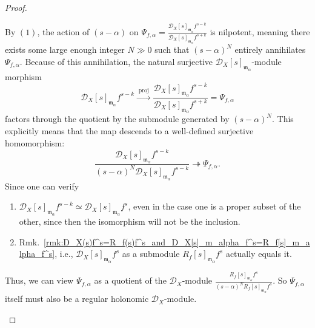 \begin{proof}
\begin{enumerate}
              By $(1)$, the action of $(s-\alpha)$ on $\Psi_{f,\alpha} = \frac{\mathcal{D}_{X}[s]_{\mathfrak{m}_{\alpha}}f^{s-k}}{\mathcal{D}_{X}[s]_{\mathfrak{m}_{\alpha}}f^{s+k}}$ is nilpotent, meaning there exists some large enough integer $N \gg 0$ such that $(s-\alpha)^N$ entirely annihilates $\Psi_{f,\alpha}$.
              Because of this annihilation, the natural surjective $\mathcal{D}_X[s]_{\mathfrak{m}_{\alpha}}$-module morphism
              \[
                  \mathcal{D}_{X}[s]_{\mathfrak{m}_{\alpha}}f^{s-k} \xrightarrow{\;\text{proj}\;} \frac{\mathcal{D}_{X}[s]_{\mathfrak{m}_{\alpha}}f^{s-k}}{\mathcal{D}_{X}[s]_{\mathfrak{m}_{\alpha}}f^{s+k}} = \Psi_{f,\alpha}
              \]
              factors through the quotient by the submodule generated by $(s-\alpha)^N$. This explicitly means that the map descends to a well-defined surjective homomorphism:
              \[
                  \frac{\mathcal{D}_X[s]_{\mathfrak{m}_{\alpha}} f^{s-k}}{(s-\alpha)^N \mathcal{D}_X[s]_{\mathfrak{m}_{\alpha}} f^{s-k}} \twoheadrightarrow \Psi_{f,\alpha}.
              \]
              Since one can verify
              \begin{enumerate}
                  \item $\mathcal{D}_{X}[s]_{\mathfrak{m}_{\alpha}}f^{s-k} \simeq \mathcal{D}_{X}[s]_{\mathfrak{m}_{\alpha}}f^{s}$, even in the case one is a proper subset of the other, since then the isomorphism will not be the inclusion.
                  \item Rmk.~\ref{rmk:D_X(s)f^s=R_f(s)f^s_and_D_X[s]_m_alpha_f^s=R_f[s]_m_alpha_f^s},
                        i.e.,
                        $\mathcal{D}_X[s]_{\mathfrak{m}_{\alpha}} f^{s}$ as a submodule $R_f[s]_{\mathfrak{m}_{\alpha}} f^{s}$ actually equals it.
              \end{enumerate}
              Thus, we can view $\Psi_{f,\alpha}$ as a quotient of the $\mathcal{D}_{X}$-module $\frac{R_f[s]_{\mathfrak{m}_{\alpha}} f^{s}}{(s-\alpha)^N R_f[s]_{\mathfrak{m}_{\alpha}} f^{s}}$.
              So $\Psi_{f,\alpha}$ itself must also be a regular holonomic $\mathcal{D}_{X}$-module.
    \end{enumerate}

\end{proof}


